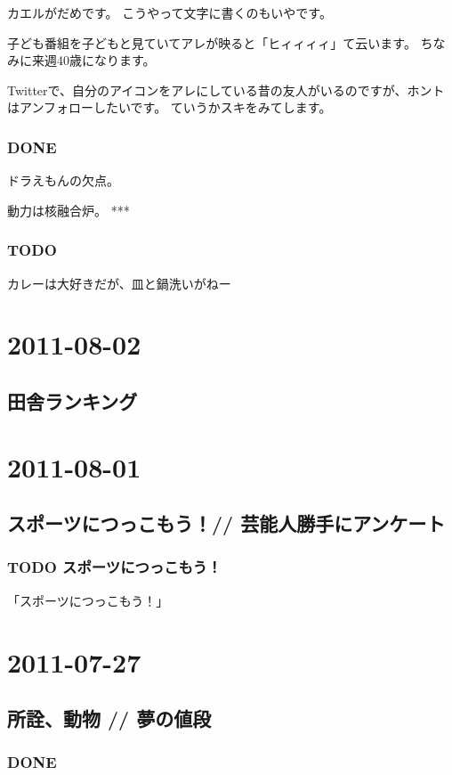 \documentclass[11pt]{article}
\begin{document}
カエルがだめです。
こうやって文字に書くのもいやです。

子ども番組を子どもと見ていてアレが映ると「ヒィィィィ」て云います。
ちなみに来週40歳になります。

Twitterで、自分のアイコンをアレにしている昔の友人がいるのですが、ホントはアンフォローしたいです。
ていうかスキをみてします。
\subsubsection{\textbf{DONE}}
\label{sec-86_1_2}

ドラえもんの欠点。

動力は核融合炉。
***
\subsubsection{\textbf{TODO}}
\label{sec-86_1_3}

カレーは大好きだが、皿と鍋洗いがねー
\section{2011-08-02}
\label{sec-87}
\subsection{田舎ランキング}
\label{sec-87_1}
\section{2011-08-01}
\label{sec-88}
\subsection{スポーツにつっこもう！// 芸能人勝手にアンケート}
\label{sec-88_1}
\subsubsection{\textbf{TODO} スポーツにつっこもう！}
\label{sec-88_1_1}

「スポーツにつっこもう！」
\section{2011-07-27}
\label{sec-89}
\subsection{所詮、動物 // 夢の値段}
\label{sec-89_1}
\subsubsection{\textbf{DONE}}
\label{sec-89_1_1}
\end{document}
